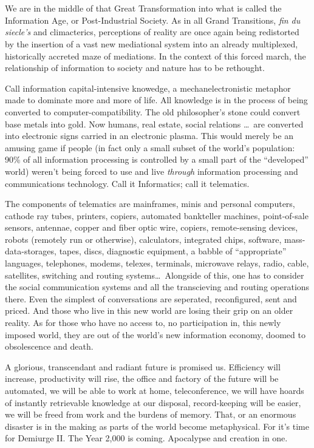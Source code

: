 \chapter{}

We are in the middle of that Great Transformation into what is called the Information Age, or
Post-Industrial Society. As in all Grand Transitions, \emph{fin du siecle's} and climacterics,
perceptions of reality are once again being redistorted by the insertion of a vast new mediational
system into an already multiplexed, historically accreted maze of mediations. In the context of this
forced march, the relationship of information to society and nature has to be rethought. 

Call information capital-intensive knowedge, a mechanelectronistic metaphor made to dominate more
and more of life. All knowledge is in the process of being converted to computer-compatibility. The
old philosopher's stone could convert base metals into gold. Now humans, real estate, social
relations \ldots\ are converted into electronic signs carried in an electronic plasma. This would
merely be an amusing game if people (in fact only a small subset of the world's population: 90\% of
all information processing is controlled by a small part of the \enquote{developed} world) weren't
being forced to use and live \emph{through} information processing and communications technology.
Call it Informatics; call it telematics. 

The components of telematics are mainframes, minis and personal computers, cathode ray tubes,
printers, copiers, automated bankteller machines, point-of-sale sensors, antennae, copper and fiber
optic wire, copiers, remote-sensing devices, robots (remotely run or otherwise), calculators,
integrated chips, software, mass-data-storages, tapes, discs, diagnostic equipment, a babble of
\enquote{appropriate} languages, telephones, modems, telexes, terminals, microwave relays, radio,
cable, satellites, switching and routing systems\ldots\ Alongside of this, one has to consider the
social communication systems and all the transcieving and routing operations there. Even the
simplest of conversations are seperated, reconfigured, sent and priced. And those who live in this
new world are losing their grip on an older reality. As for those who have no access to, no
participation in, this newly imposed world, they are out of the world's new information economy,
doomed to obsolescence and death. 

A glorious, transcendant and radiant future is promised us. Efficiency will increase, productivity
will rise, the office and factory of the future will be automated, we will be able to work at home,
teleconference, we will have hoards of instantly retrievable knowledge at our disposal,
record-keeping will be easier, we will be freed from work and the burdens of memory. That, or an
enormous disaster is in the making as parts of the world become metaphysical. For it's time for
Demiurge II. The Year 2,000 is coming. Apocalypse and creation in one. 

